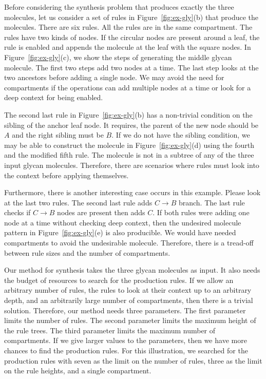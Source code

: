 Before considering the synthesis problem that produces exactly
the three molecules,
let us consider a set of rules in Figure~\ref{fig:ex-gly}(b)
that produce the molecules.
There are six rules.
All the rules are in the same compartment.
The rules have two kinds of nodes.
If the circular nodes are present around a leaf,
the rule is enabled and appends the molecule at the leaf with the square nodes.
In Figure~\ref{fig:ex-gly}(c), we show the steps of generating the middle
glycan molecule.
The first two steps add two nodes at a time.
The last step looks at the two ancestors before adding a single node.
We may avoid the need for compartments if the operations can add multiple nodes at
a time or look for a deep context for being enabled.

The second last rule in Figure~\ref{fig:ex-gly}(b) has a non-trivial condition
on the sibling of the anchor leaf node.
It requires, the parent of the new node should be $A$ and the right sibling
must be $B$.
If we do not have the sibling condition, we may be able to construct the molecule
in Figure~\ref{fig:ex-gly}(d) using the fourth and the modified fifth rule.
The molecule is not in a subtree of any of the three input glycan molecules.
Therefore, there are scenarios where rules must look into the context before applying
themselves.

Furthermore, there is another interesting case occurs in this example.
Please look at the last two rules.
The second last rule adds $C\rightarrow B$ branch.
The last rule checks if $C\rightarrow B$ nodes are present then adds $C$.
If both rules were adding one node at a time without checking deep context,
then the undesired molecule pattern in Figure~\ref{fig:ex-gly}(e) is
also producible.
We would have needed compartments to avoid the undesirable molecule.
Therefore, there is a tread-off between rule sizes and the number of compartments.


Our method for synthesis takes the three glycan molecules as input.
It also needs the budget of resources to search for the production rules.
If we allow an arbitrary number of rules,
the rules to look at their context up to
an arbitrary depth, and an arbitrarily large number of compartments,
then there is a trivial solution.
Therefore, our method needs three parameters.
The first parameter limits the number of rules.
The second parameter limits the maximum height of the rule trees.
The third parameter limits the maximum number of compartments.
If we give larger values to the parameters, then we have more chances to
find the production rules.
For this illustration, we searched for the production rules with
seven as the limit on the number of rules, three as the limit on the rule heights,
and a single compartment.


